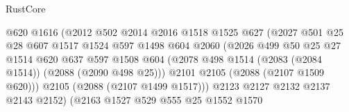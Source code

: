 \begin{lexlean}{RustCore}
\begin{coremodule}
                                      @620
                                      @1616
                                      (@2012
                                        @502
                                        @2014
                                        @2016
                                        @1518
                                        @1525
                                        @627
                                        (@2027
                                          @501
                                          @25
                                          @28
                                          @607
                                          @1517
                                          @1524
                                          @597
                                          @1498
                                          @604
                                          @2060
                                          (@2026
                                            @499
                                            @50
                                            @25
                                            @27
                                            @1514
                                            @620
                                            @637
                                            @597
                                            @1508
                                            @604
                                            (@2078
                                              @498
                                              @1514
                                              (@2083 (@2084 @1514))
                                              (@2088 (@2090 @498 @25)))
                                            @2101
                                            @2105
                                            (@2088 (@2107 @1509 @620)))
                                          @2105
                                          (@2088 (@2107 @1499 @1517)))
                                        @2123
                                        @2127
                                        @2132
                                        @2137
                                        @2143
                                        @2152)
                                      (@2163
                                        @1527
                                        @529
                                        @555
                                        @25
                                        @1552
                                        @1570

\end{coremodule}
\end{lexlean}
